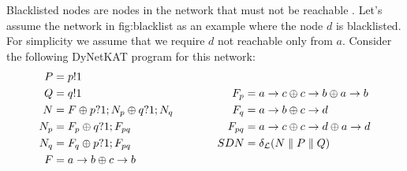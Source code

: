 \begin{example}
    \begin{figure}
        \centering
        \caption{}
        \label{fig:blacklist}
    \end{figure}
    Blacklisted nodes are nodes in the network that must not
    be reachable \cite{network-abstractions}.
    Let's assume the network in \refname{fig:blacklist} as
    an example where the node $d$ is blacklisted.
    For simplicity we assume that we require
    $d$ not reachable only from $a$.
    Consider the following DyNetKAT program for this network:
    \begin{equation*}
        \begin{aligned}[c]
            P   & = p!1                             \\
            Q   & = q!1                             \\
            N   & = F \oplus p?1;N_p \oplus q?1;N_q \\
            N_p & = F_p \oplus q?1;F_{pq}           \\
            N_q & = F_q \oplus p?1;F_{pq}           \\
            F   & = a\ra b \oplus c\ra b            \\
        \end{aligned}
        \qquad\qquad
        \begin{aligned}[c]
            F_p         & = a\ra c \oplus c\ra b \oplus a\ra b \\
            F_q         & = a\ra b \oplus c\ra d               \\
            F_{pq}      & = a\ra c \oplus c\ra d \oplus a\ra d \\
            SDN         & = \delta_{\mathcal{L}} (N
            \parallel P \parallel Q)                           \\

\end{aligned}
\end{equation*}
\end{example}
